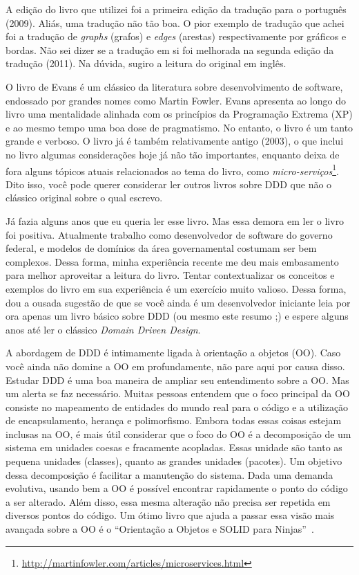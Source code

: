 \documentclass[a4paper, 12pt]{article}
\newcommand{\ddd}{\emph{Domain Driven Design}\xspace}
\begin{document}
A edição do livro que utilizei foi a primeira edição da tradução para o português (2009). Aliás, uma tradução não tão boa. O pior exemplo de tradução que achei foi a tradução de \emph{graphs} (grafos) e \emph{edges} (arestas) respectivamente por gráficos e bordas. Não sei dizer se a tradução em si foi melhorada na segunda edição da tradução (2011). Na dúvida, sugiro a leitura do original em inglês.

O livro de Evans é um clássico da literatura sobre desenvolvimento de software, endossado por grandes nomes como Martin Fowler. Evans apresenta ao longo do livro uma mentalidade alinhada com os princípios da Programação Extrema (XP) e ao mesmo tempo uma boa dose de pragmatismo. No entanto, o livro é um tanto grande e verboso. O livro já é também relativamente antigo (2003), o que inclui no livro algumas considerações hoje já não tão importantes, enquanto deixa de fora alguns tópicos atuais relacionados ao tema do livro, como \emph{micro-serviços}\footnote{\url{http://martinfowler.com/articles/microservices.html}}. Dito isso, você pode querer considerar ler outros livros sobre DDD que não o clássico original sobre o qual escrevo.

Já fazia alguns anos que eu queria ler esse livro. Mas essa demora em ler o livro foi positiva. Atualmente trabalho como desenvolvedor de software do governo federal, e modelos de domínios da área governamental costumam ser bem complexos. Dessa forma, minha experiência recente me deu mais embasamento para melhor aproveitar a leitura do livro. Tentar contextualizar os conceitos e exemplos do livro em sua experiência é um exercício muito valioso. Dessa forma, dou a ousada sugestão de que se você ainda é um desenvolvedor iniciante leia por ora apenas um livro básico sobre DDD (ou mesmo este resumo ;) e espere alguns anos até ler o clássico \ddd.

A abordagem de DDD é intimamente ligada à orientação a objetos (OO). Caso você ainda não domine a OO em profundamente, não pare aqui por causa disso. Estudar DDD é uma boa maneira de ampliar seu entendimento sobre a OO. Mas um alerta se faz necessário. Muitas pessoas entendem que o foco principal da OO consiste no mapeamento de entidades do mundo real para o código e a utilização de encapsulamento, herança e polimorfismo. Embora todas essas coisas estejam inclusas na OO, é mais útil considerar que o foco do OO é a decomposição de um sistema em unidades coesas e fracamente acopladas. Essas unidade são tanto as pequena unidades (classes), quanto as grandes unidades (pacotes). Um objetivo dessa decomposição é facilitar a manutenção do sistema. Dada uma demanda evolutiva, usando bem a OO é possível encontrar rapidamente o ponto do código a ser alterado. Além disso, essa mesma alteração não precisa ser repetida em diversos pontos do código. Um ótimo livro que ajuda a passar essa visão mais avançada sobre a OO é o ``Orientação a Objetos e SOLID para Ninjas''~\cite{Aniche2015Ninjas}.
\end{document}
